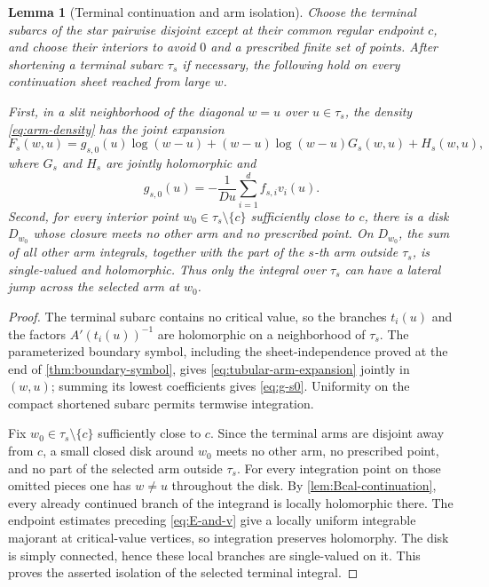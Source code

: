 \documentclass[11pt]{article}
\numberwithin{equation}{section}
\newtheorem{lemma}[lemma]{Lemma}
\theoremstyle{definition}
\theoremstyle{remark}
\begin{document}
\begin{lemma}[Terminal continuation and arm isolation]
\label{lem:arm-continuation}
Choose the terminal subarcs of the star pairwise disjoint except at their
common regular endpoint $c$, and choose their interiors to avoid $0$ and a
prescribed finite set of points.  After shortening a terminal subarc
$\tau_s$ if necessary, the following hold on every continuation sheet
reached from large $w$.

First, in a slit neighborhood of the diagonal $w=u$ over $u\in\tau_s$, the
density \eqref{eq:arm-density} has the joint expansion
\begin{equation}\label{eq:tubular-arm-expansion}
  F_s(w,u)
  =g_{s,0}(u)\log(w-u)
   +(w-u)\log(w-u)G_s(w,u)+H_s(w,u),
\end{equation}
where $G_s$ and $H_s$ are jointly holomorphic and
\begin{equation}\label{eq:g-s0}
  g_{s,0}(u)=-\frac1{Du}\sum_{i=1}^d f_{s,i}v_i(u).
\end{equation}
Second, for every interior point $w_0\in\tau_s\setminus\{c\}$ sufficiently
close to $c$, there is a disk $D_{w_0}$ whose closure meets no other arm and
no prescribed point.  On $D_{w_0}$, the sum of all other arm integrals,
together with the part of the $s$-th arm outside $\tau_s$, is single-valued
and holomorphic.  Thus only the integral over $\tau_s$ can have a lateral
jump across the selected arm at $w_0$.
\end{lemma}

\begin{proof}
The terminal subarc contains no critical value, so the branches $t_i(u)$ and
the factors $A'(t_i(u))^{-1}$ are holomorphic on a neighborhood of
$\tau_s$.  The parameterized boundary symbol, including the
sheet-independence proved at the end of \cref{thm:boundary-symbol}, gives
\eqref{eq:tubular-arm-expansion} jointly in $(w,u)$; summing its lowest
coefficients gives \eqref{eq:g-s0}.  Uniformity on the compact shortened
subarc permits termwise integration.

Fix $w_0\in\tau_s\setminus\{c\}$ sufficiently close to $c$.  Since the
terminal arms are disjoint away from $c$, a small closed disk around $w_0$
meets no other arm, no prescribed point, and no part of the selected arm
outside $\tau_s$.  For every integration point on those omitted pieces one
has $w\ne u$ throughout the disk.  By
\cref{lem:Bcal-continuation}, every already continued branch of the
integrand is locally holomorphic there.  The endpoint estimates preceding
\eqref{eq:E-and-v} give a locally uniform integrable majorant at
critical-value vertices, so integration preserves holomorphy.  The disk is
simply connected, hence these local branches are single-valued on it.  This
proves the asserted isolation of the selected terminal integral.
\end{proof}
\end{document}
